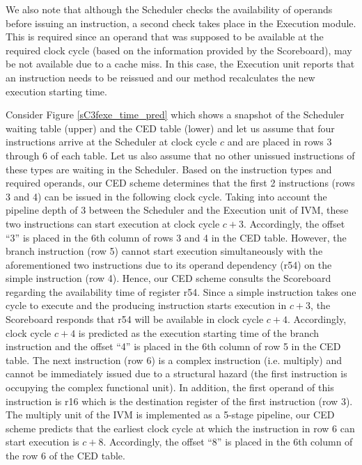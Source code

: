 \documentclass[12pt]{yalephd}
\begin{document}
We also note that although the Scheduler checks the availability of operands before issuing an instruction, a second check takes place in the Execution module. This is required since an operand that was supposed to be available at the required clock cycle (based on the information provided by the Scoreboard), may be not available due to a cache miss. In this case, the Execution unit reports that an instruction needs to be reissued and our method recalculates the new execution starting time.

 Consider Figure \ref{sC3fexe_time_pred} which shows a snapshot of the Scheduler waiting table (upper) and the CED table (lower) and let us assume that four instructions arrive at the Scheduler at clock cycle $c$ and are placed in rows 3 through 6 of each table. Let us also assume that no other unissued instructions of these types are waiting in the Scheduler. Based on the instruction types and required operands, our CED scheme determines that the first 2 instructions (rows 3 and 4) can be issued in the following clock cycle. Taking into account the pipeline depth of 3 between the Scheduler and the Execution unit of IVM, these two instructions can start execution at clock cycle $c+3$. Accordingly, the offset ``3'' is placed in the 6th column of rows 3 and 4 in the CED table. However, the branch instruction (row 5) cannot start execution simultaneously with the aforementioned two instructions due to its operand dependency (r54) on the simple instruction (row 4). Hence, our CED scheme consults the Scoreboard regarding the availability time of register r54. Since a simple instruction takes one cycle to execute and the producing instruction starts execution in $c+3$, the Scoreboard responds that r54 will be available in clock cycle $c+4$. Accordingly, clock cycle $c+4$ is predicted as the execution starting time of the branch instruction and the offset ``4'' is placed in the 6th column of row 5 in the CED table. The next instruction (row 6) is a complex instruction (i.e. multiply) and cannot be immediately issued due to a structural hazard (the first instruction is occupying the complex functional unit). In addition, the first operand of this instruction is r16 which is the destination register of the first instruction (row 3). The multiply unit of the IVM is implemented as a 5-stage pipeline, our CED scheme predicts that the earliest clock cycle at which the instruction in row 6 can start execution is $c+8$. Accordingly, the offset ``8'' is placed in the 6th column of the row 6 of the CED table.
\end{document}
